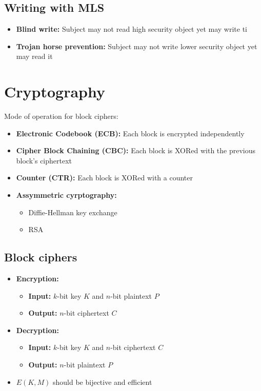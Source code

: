 \documentclass[12pt,a4paper]{article}
\begin{document}
\subsection{Writing with MLS}
\begin{itemize}
    \item \textbf{Blind write:} Subject may not read high security object yet may write ti 
    \item \textbf{Trojan horse prevention:} Subject may not write lower security object yet may read it
\end{itemize}

\section{Cryptography}
Mode of operation for block ciphers:
\begin{itemize}
    \item \textbf{Electronic Codebook (ECB):} Each block is encrypted independently
    \item \textbf{Cipher Block Chaining (CBC):} Each block is XORed with the previous block's ciphertext
    \item \textbf{Counter (CTR):} Each block is XORed with a counter
\end{itemize}
\begin{itemize}
    \item \textbf{Assymmetric cyrptography:} 
    \begin{itemize}
        \item Diffie-Hellman key exchange
        \item RSA
    \end{itemize}
\end{itemize}

\subsection{Block ciphers}
\begin{itemize}
    \item \textbf{Encryption:} 
    \begin{itemize}
        \item \textbf{Input:} $k$-bit key $K$ and $n$-bit plaintext $P$
        \item \textbf{Output:} $n$-bit ciphertext $C$
    \end{itemize}
    \item \textbf{Decryption:}
    \begin{itemize}
        \item \textbf{Input:} $k$-bit key $K$ and $n$-bit ciphertext $C$
        \item \textbf{Output:} $n$-bit plaintext $P$
    \end{itemize}
    \item $E(K,M)$ should be bijective and efficient
\end{itemize}
\end{document}

